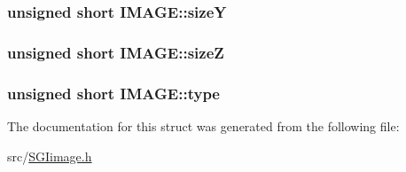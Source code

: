 \subsubsection[{size\+Y}]{\setlength{\rightskip}{0pt plus 5cm}unsigned short I\+M\+A\+G\+E\+::size\+Y}\label{structIMAGE_ab61c98eaf9f32603dfcad280aa90d96b}
\hypertarget{structIMAGE_ad908fc81625a946abc3eefb3be97a4d5}{}
\subsubsection[{size\+Z}]{\setlength{\rightskip}{0pt plus 5cm}unsigned short I\+M\+A\+G\+E\+::size\+Z}\label{structIMAGE_ad908fc81625a946abc3eefb3be97a4d5}
\hypertarget{structIMAGE_a310120266ae4398ac530b966b3d43ef0}{}
\subsubsection[{type}]{\setlength{\rightskip}{0pt plus 5cm}unsigned short I\+M\+A\+G\+E\+::type}\label{structIMAGE_a310120266ae4398ac530b966b3d43ef0}


The documentation for this struct was generated from the following file\+:\begin{DoxyCompactItemize}
\item 
src/\hyperlink{SGIimage_8h}{S\+G\+Iimage.\+h}\end{DoxyCompactItemize}
